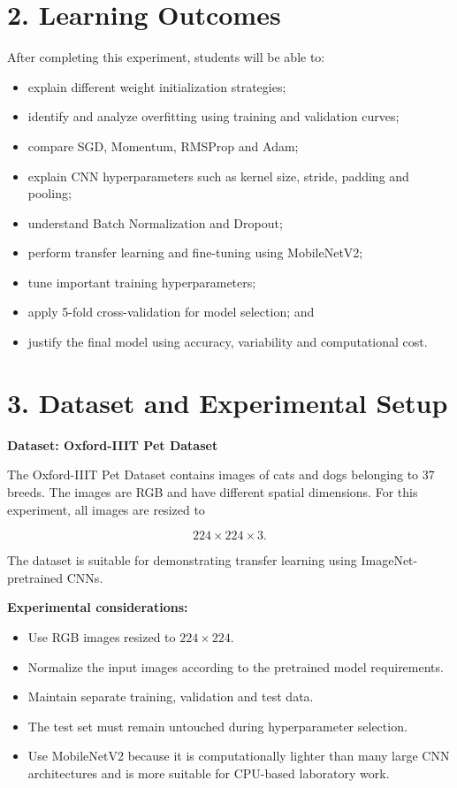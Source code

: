 \documentclass[10pt]{article}
\begin{document}
\section*{2. Learning Outcomes}

After completing this experiment, students will be able to:

\begin{itemize}
\item explain different weight initialization strategies;
\item identify and analyze overfitting using training and validation curves;
\item compare SGD, Momentum, RMSProp and Adam;
\item explain CNN hyperparameters such as kernel size, stride, padding and pooling;
\item understand Batch Normalization and Dropout;
\item perform transfer learning and fine-tuning using MobileNetV2;
\item tune important training hyperparameters;
\item apply 5-fold cross-validation for model selection; and
\item justify the final model using accuracy, variability and computational cost.
\end{itemize}

\section*{3. Dataset and Experimental Setup}

\textbf{Dataset: Oxford-IIIT Pet Dataset}

The Oxford-IIIT Pet Dataset contains images of cats and dogs belonging to 37
breeds. The images are RGB and have different spatial dimensions. For this
experiment, all images are resized to

\[
224\times224\times3.
\]

The dataset is suitable for demonstrating transfer learning using ImageNet-pretrained
CNNs.

\textbf{Experimental considerations:}

\begin{itemize}
\item Use RGB images resized to $224\times224$.
\item Normalize the input images according to the pretrained model requirements.
\item Maintain separate training, validation and test data.
\item The test set must remain untouched during hyperparameter selection.
\item Use MobileNetV2 because it is computationally lighter than many large CNN
architectures and is more suitable for CPU-based laboratory work.
\end{itemize}
\end{document}
